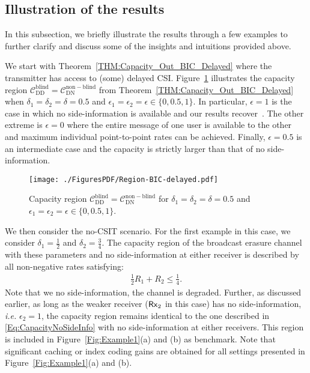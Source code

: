 \documentclass[journal,12pt,draftcls,onecolumn]{IEEEtran}
\begin{document}













\subsection{Illustration of the results}

In this subsection, we briefly illustrate the results through a few examples to further clarify and discuss some of the insights and intuitions provided above.

We start with Theorem~\ref{THM:Capacity_Out_BIC_Delayed} where the transmitter has access to (some) delayed CSI. Figure~\ref{Fig:Region-BIC-delayed} illustrates the capacity region $\mathcal{C}^{\mathrm{blind}}_{\mathrm{DD}}=\mathcal{C}^{\mathrm{non-blind}}_{\mathrm{DN}}$  from Theorem~\ref{THM:Capacity_Out_BIC_Delayed} when $\delta_1 = \delta_2 = \delta = 0.5$ and $\epsilon_1 = \epsilon_2 = \epsilon \in \{ 0, 0.5, 1\}$. In particular, $\epsilon = 1$ is the case in which no side-information is available and our results recover~\cite{GatzianasGeorgiadis_13}. The other extreme is $\epsilon = 0$ where the entire message of one user is available to the other and maximum individual point-to-point rates can be achieved. Finally, $\epsilon = 0.5$ is an intermediate case and the capacity is strictly larger than that of no side-information.

\begin{figure}[!ht]
\centering
\texttt{[image: ./FiguresPDF/Region-BIC-delayed.pdf]}
\caption{Capacity region $\mathcal{C}^{\mathrm{blind}}_{\mathrm{DD}}=\mathcal{C}^{\mathrm{non-blind}}_{\mathrm{DN}}$  for $\delta_1 = \delta_2=\delta = 0.5$ and $\epsilon_1 = \epsilon_2=\epsilon \in \{ 0, 0.5, 1\}$.\label{Fig:Region-BIC-delayed}}
\end{figure}

We then consider the no-CSIT scenario. For the first example in this case, we consider $\delta_1 = \frac{1}{2}$ and $\delta_2 = \frac{3}{4}$. The capacity region of the broadcast erasure channel with these parameters and no side-information at either receiver is described by all non-negative rates satisfying:
\begin{align}
\label{Eq:CapacityNoSideInfo}
\frac{1}{2}R_1 + R_2 \leq \frac{1}{4}.
\end{align}
Note that we no side-information, the channel is degraded. Further, as discussed earlier, as long as the weaker receiver (${\sf Rx}_2$ in this case) has no side-information, \emph{i.e.} $\epsilon_2 = 1$, the capacity region remains identical to the one described in \eqref{Eq:CapacityNoSideInfo} with no side-information at either receivers. This region is included in Figure~\ref{Fig:Example1}(a) and (b) as benchmark. Note that significant caching or index coding gains are obtained for all settings presented in Figure~\ref{Fig:Example1}(a) and (b).
\end{document}
